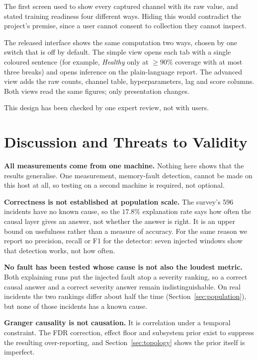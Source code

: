 \documentclass[conference]{IEEEtran}
\begin{document}
The first screen used to show every captured channel with its raw value, and
stated training readiness four different ways. Hiding this would contradict
the project's premise, since a user cannot consent to collection they cannot
inspect.

The released interface shows the same computation two ways, chosen by one
switch that is off by default. The simple view opens each tab with a single
coloured sentence (for example, \emph{Healthy} only at $\ge 90\%$ coverage
with at most three breaks) and opens inference on the plain-language report.
The advanced view adds the raw counts, channel table, hyperparameters, lag
and score columns. Both views read the same figures; only presentation
changes.

This design has been checked by one expert review, not with users.

\section{Discussion and Threats to Validity}

\textbf{All measurements come from one machine.} Nothing here shows that the
results generalise. One measurement, memory-fault detection, cannot be made on
this host at all, so testing on a second machine is required, not optional.

\textbf{Correctness is not established at population scale.} The survey's 596
incidents have no known cause, so the $17.8\%$ explanation rate says how often
the causal layer gives an answer, not whether the answer is right. It is an
upper bound on usefulness rather than a measure of accuracy. For the same
reason we report no precision, recall or F1 for the detector: seven injected
windows show that detection works, not how often.

\textbf{No fault has been tested whose cause is not also the loudest metric.}
Both explaining runs put the injected fault atop a severity ranking, so a
correct causal answer and a correct severity answer remain indistinguishable.
On real incidents the two rankings differ about half the time
(Section~\ref{sec:population}), but none of those incidents has a known
cause.

\textbf{Granger causality is not causation.} It is correlation under a temporal
constraint. The FDR correction, effect floor and subsystem prior exist to
suppress the resulting over-reporting, and Section~\ref{sec:topology} shows the
prior itself is imperfect.
\end{document}
